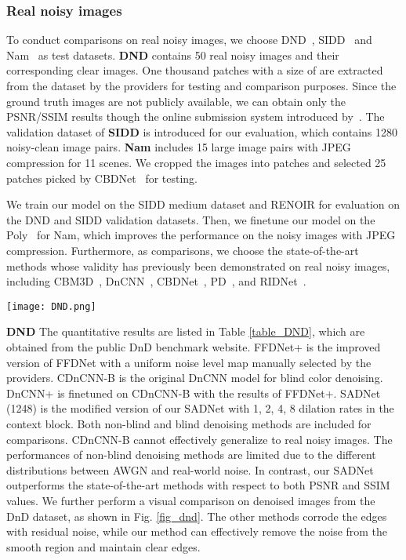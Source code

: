 \documentclass[runningheads]{llncs}
\begin{document}
\subsubsection{Real noisy images}

To conduct comparisons on real noisy images, we choose DND~\cite{plotz2017benchmarking}, SIDD~\cite{abdelhamed2018high} and Nam~\cite{nam2016holistic} as test datasets. \textbf{DND} contains 50 real noisy images and their corresponding clear images. One thousand patches with a size of  are extracted from the dataset by the providers for testing and comparison purposes. Since the ground truth images are not publicly available, we can  obtain only the PSNR/SSIM results though the online submission system introduced by~\cite{plotz2017benchmarking}. The validation dataset of \textbf{SIDD} is introduced for our evaluation, which contains 1280  noisy-clean image pairs. \textbf{Nam} includes 15 large image pairs with JPEG compression for 11 scenes. We cropped the images into  patches and selected 25 patches picked by CBDNet~\cite{guo2019toward} for testing. 

We train our model on the SIDD medium dataset and RENOIR for evaluation on the DND and SIDD validation datasets. Then, we finetune our model on the Poly~\cite{xu2018real} for Nam, which improves the performance on the noisy images with JPEG compression.
Furthermore, as comparisons, we choose the state-of-the-art methods whose validity has previously been demonstrated on real noisy images, including CBM3D~\cite{dabov2007color}, DnCNN~\cite{zhang2017beyond}, CBDNet~\cite{guo2019toward}, PD~\cite{zhou2019awgn}, and RIDNet~\cite{anwar2019real}. 


\begin{figure*}[t]
\begin{center}
\texttt{[image: DND.png]}
\end{center}
\setlength{\abovecaptionskip}{0.cm}
   \caption{Real image denoising results from the DnD dataset.}
\label{fig_dnd}
\end{figure*}

\textbf{DND}
The quantitative results are listed in Table \ref{table_DND}, which are obtained from the public DnD benchmark website. FFDNet+ is the improved version of FFDNet with a uniform noise level map manually selected by the providers. CDnCNN-B is the original DnCNN model for blind color denoising. DnCNN+ is finetuned on CDnCNN-B with the results of FFDNet+. SADNet (1248) is the modified version of our SADNet with 1, 2, 4, 8 dilation rates in the context block. Both non-blind and blind denoising methods are included for comparisons. CDnCNN-B cannot effectively generalize to real noisy images. The performances of non-blind denoising methods are limited due to the different distributions between AWGN and real-world noise. In contrast, our SADNet outperforms the state-of-the-art methods with respect to both PSNR and SSIM values. We further perform a visual comparison on denoised images from the DnD dataset, as shown in Fig. \ref{fig_dnd}. The other methods corrode the edges with residual noise, while our method can effectively remove the noise from the smooth region and maintain clear edges.     
\end{document}
